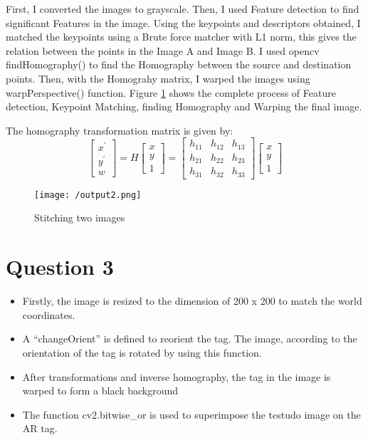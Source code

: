 \documentclass[a4paper, 10pt]{article}
\begin{document}
\begin{multicols}{2}
		First, I converted the images to grayscale. Then, I used Feature detection to find significant Features in the image. Using the keypoints and descriptors obtained, I matched the keypoints using a Brute force matcher with L1 norm, this gives the relation between the points in the Image A and Image B. I used opencv findHomography() to find the Homography between the source and destination points. Then, with the Homograhy matrix, I warped the images using warpPerspective() function. Figure \ref{fig:op2} shows the complete process of Feature detection, Keypoint Matching, finding Homography and Warping the final image.
		
		The homography transformation matrix is given by:
		\[
		\begin{bmatrix}
		x^{'} \\
		y^{'} \\
		w
		\end{bmatrix} =
		H\begin{bmatrix}
		x \\
		y \\
		1
		\end{bmatrix} = 
		\begin{bmatrix}
		h_{11} & h_{12} & h_{13}\\
		h_{21} & h_{22} & h_{23}\\
		h_{31} & h_{32} & h_{33}
		\end{bmatrix}
		\begin{bmatrix}
		x \\
		y \\
		1
		\end{bmatrix}
		\]
		
		\begin{figure}[H]
			\centering
			\texttt{[image: /output2.png]}
			\caption{Stitching two images}
			\label{fig:op2}
		\end{figure}
		
		
		
		\section{Question 3}
		
		
		
		\begin{itemize}
		\item Firstly, the image is resized to the dimension of 200 x 200 to match the world coordinates.
		\item A “changeOrient” is defined to reorient the tag. The image, according to the orientation of the tag is rotated by using this function.
		\item After transformations and inverse homography, the tag in the image is warped to form a black background
		\item The function cv2.bitwise\_or is used to superimpose the testudo image on the AR tag.
		\end{itemize}
	


\end{multicols}
\end{document}
